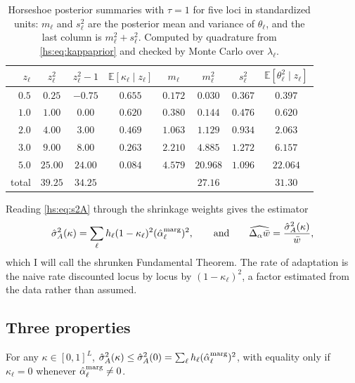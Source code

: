 \begin{table}[t]
\centering
\small
\begin{tabular}{@{}rccccccc@{}}
\toprule
$z_\ell$ & $z_\ell^2$ & $z_\ell^2-1$ & $\mathbb{E}[\kappa_\ell\mid z_\ell]$ & $m_\ell$ & $m_\ell^2$ & $s_\ell^2$ & $\mathbb{E}[\theta_\ell^2\mid z_\ell]$ \\
\midrule
$0.5$ & $0.25$ & $-0.75$ & $0.655$ & $0.172$ & $0.030$ & $0.367$ & $0.397$ \\
$1.0$ & $1.00$ & $0.00$ & $0.620$ & $0.380$ & $0.144$ & $0.476$ & $0.620$ \\
$2.0$ & $4.00$ & $3.00$ & $0.469$ & $1.063$ & $1.129$ & $0.934$ & $2.063$ \\
$3.0$ & $9.00$ & $8.00$ & $0.263$ & $2.210$ & $4.885$ & $1.272$ & $6.157$ \\
$5.0$ & $25.00$ & $24.00$ & $0.084$ & $4.579$ & $20.968$ & $1.096$ & $22.064$ \\
\midrule
total & $39.25$ & $34.25$ & & & $27.16$ & & $31.30$ \\
\bottomrule
\end{tabular}
\caption{Horseshoe posterior summaries with $\tau = 1$ for five loci in standardized units: $m_\ell$ and $s^2_\ell$ are the posterior mean and variance of $\theta_\ell$, and the last column is $m_\ell^2 + s_\ell^2$. Computed by quadrature from \eqref{hs:eq:kappaprior} and checked by Monte Carlo over $\lambda_\ell$.}
\label{hs:tab:weights}
\end{table}

Reading \eqref{hs:eq:s2A} through the shrinkage weights gives the estimator
\begin{equation}
\hat\sigma^2_A(\kappa) = \sum_\ell h_\ell (1-\kappa_\ell)^2 (\hat\alpha^{\rm marg}_\ell)^2,
\qquad\text{and}\qquad
\widehat{\Delta_\alpha \bar w} = \frac{\hat\sigma^2_A(\kappa)}{\bar w},
\label{hs:eq:shrunkFTNS}
\end{equation}
which I will call the shrunken Fundamental Theorem. The rate of adaptation is the naive rate discounted locus by locus by $(1-\kappa_\ell)^2$, a factor estimated from the data rather than assumed.

\subsection{Three properties}

\begin{proposition}
\label{hs:prop:conservative}
For any $\kappa \in [0,1]^L$, $\hat\sigma^2_A(\kappa) \le \hat\sigma^2_A(0) = \sum_\ell h_\ell (\hat\alpha^{\rm marg}_\ell)^2$, with equality only if $\kappa_\ell = 0$ whenever $\hat\alpha^{\rm marg}_\ell \ne 0$.
\end{proposition}

